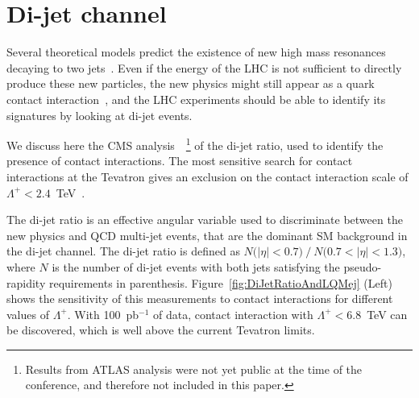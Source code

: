 \documentclass{cmspaper}
\begin{document}
\section{Di-jet channel} \label{dijet}
Several theoretical models predict the existence of new 
high mass resonances decaying to two 
jets~\cite{Baur:1989kv,Bagger:1987fz,Angelopoulos:1986uq}.
Even if the energy of the LHC is not sufficient to directly produce 
these new particles, the new physics might still appear as 
a quark contact interaction~\cite{Eichten:1983hw}, 
and the LHC experiments should 
be able to identify its signatures by looking at di-jet events.

We discuss here the CMS analysis~\cite{DIJETSNOTE}~\footnote{Results 
from ATLAS analysis were not yet public at the time 
of the conference, and therefore not included in this paper.}
of the di-jet ratio, used to identify the presence of contact interactions. 
The most sensitive search for contact interactions at the Tevatron 
gives an exclusion on the contact interaction scale 
of $\Lambda^{+} < 2.4$~TeV~\cite{Abbott:1998wh}.  

The di-jet ratio is an effective angular variable used to 
discriminate between the new physics and QCD multi-jet events, 
that are the dominant SM background in the di-jet channel. The di-jet ratio is 
defined as $N\mbox{(}|\eta|<0.7\mbox{)}~/~N\mbox{(}0.7<|\eta|< 1.3 \mbox{)}$, 
where $N$ is the number of di-jet events with both jets satisfying the 
pseudo-rapidity requirements in parenthesis. 
Figure~\ref{fig:DiJetRatioAndLQMej} (Left) shows the sensitivity of this 
measurements to contact interactions for different values of $\Lambda^{+}$. 
With 100~pb$^{-1}$ of data, contact interaction with
$\Lambda^{+} < 6.8$~TeV can be discovered, which is well above the 
current Tevatron limits.
 
\end{document}
